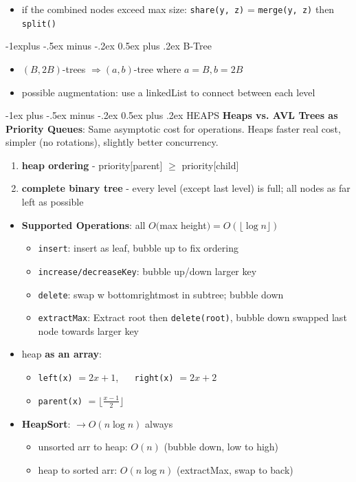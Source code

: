 \documentclass[10pt, landscape]{article}
\makeatletter
\newcommand{\floor}[1]{\lfloor #1 \rfloor}
\let\then\rightarrow
\let\Then\Rightarrow
\newcommand{\code}[1]{\colorbox{gray!25!}{\lstinline|#1|}}
\renewcommand{\section}{\@startsection{section}{1}{0mm}%
                                {-1ex plus -.5ex minus -.2ex}%
                                {0.5ex plus .2ex}%
                                {\normalfont\large\bfseries}}
\renewcommand{\subsection}{\@startsection{subsection}{2}{0.1mm}%
                                {-1explus -.5ex minus -.2ex}%
                                {0.5ex plus .2ex}%
                                {\normalfont\normalsize\bfseries}}
\makeatother
\begin{document}
\begin{multicols}{4}
\begin{itemize}
\begin{itemize}
        \item if the combined nodes exceed max size: \code{share(y, z)} = \code{merge(y, z)} then \code{split()}
    \end{itemize}
\end{itemize}

\subsection{B-Tree}
\begin{itemize}
    \item $(B, 2B)$-trees $\Then (a, b)$-tree where $a=B, b=2B$ 
    \item possible augmentation: use a linkedList to connect between each level
\end{itemize}


\section{HEAPS}
\textbf{Heaps vs. AVL Trees as Priority Queues}: Same asymptotic cost for operations. Heaps faster real cost, simpler (no rotations), slightly better concurrency.
\begin{enumerate}
    \item \textbf{heap ordering} - priority[parent] $\geq$ priority[child]
    \item \textbf{complete binary tree} - every level (except last level) is full; all nodes as far left as possible
\end{enumerate}
\begin{itemize}
    \item \textbf{Supported Operations}: all $O($max height$) = O(\floor{\log n})$
    \begin{itemize}
        \item \code{insert}: insert as leaf, bubble up to fix ordering
        \item \code{increase/decreaseKey}: bubble up/down larger key
        \item \code{delete}: swap w bottomrightmost in subtree; bubble down
        \item \code{extractMax}: Extract root then \code{delete(root)}, bubble down swapped last node towards larger key
    \end{itemize}
    \item heap \textbf{as an array}:
    \begin{itemize}
        \item \code{left(x)} $= 2x + 1$, $\quad$ \code{right(x)} $= 2x + 2$
        \item \code{parent(x)} $= \floor{\frac{x-1}{2}}$
    \end{itemize}
    \item \textbf{HeapSort}: $\then O(n \log n)$ always
    \begin{itemize}
        \item unsorted arr to heap: $O(n)$ (bubble down, low to high)
        \item heap to sorted arr: $O(n \log n)$ (extractMax, swap to back)
    \end{itemize}
\end{itemize}


\end{multicols}
\end{document}

